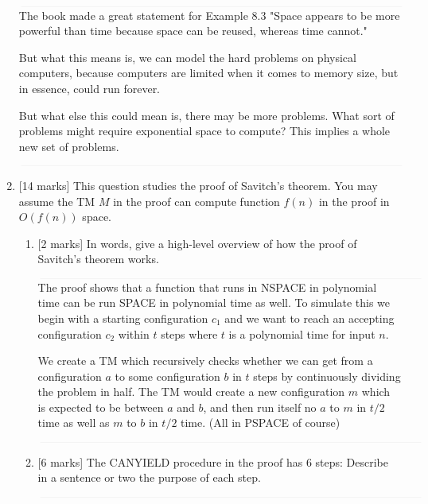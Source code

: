 \documentclass{article}
\begin{document}
\begin{enumerate}
            $\textcolor[RGB]{220,220,220}{\rule{\linewidth}{0.2pt}}$
            The book made a great statement for Example 8.3 "Space appears to be more powerful than time because space can be reused, whereas time cannot."

            But what this means is, we can model the hard problems on physical computers, because computers are limited when it comes to memory size, but in essence, could run forever.

            But what else this could mean is, there may be more problems. What sort of problems might require exponential space to compute? This implies a whole new set of problems.

            $\textcolor[RGB]{220,220,220}{\rule{\linewidth}{0.2pt}}$

            \item {[14 marks]} This question studies the proof of Savitch's theorem. You may assume the TM $M$ in the proof can compute function $f(n)$ in the proof in $O(f(n))$ space.
            \begin{enumerate}
                \item {[2 marks]} In words, give a high-level overview of how the proof of Savitch's theorem works.

            $\textcolor[RGB]{220,220,220}{\rule{\linewidth}{0.2pt}}$
            The proof shows that a function that runs in NSPACE in polynomial time can be run SPACE in polynomial time as well. To simulate this we begin with a starting configuration $c_1$ and we want to reach an accepting configuration $c_2$ within $t$ steps where $t$ is a polynomial time for input $n$.

            We create a TM which recursively checks whether we can get from a configuration $a$ to some configuration $b$ in $t$ steps by continuously dividing the problem in half. The TM would create a new configuration $m$ which is expected to be between $a$ and $b$, and then run itself no $a$ to $m$ in $t/2$ time as well as $m$ to $b$ in $t/2$ time. (All in PSPACE of course)

            $\textcolor[RGB]{220,220,220}{\rule{\linewidth}{0.2pt}}$

                \item {[6 marks]} The CANYIELD procedure in the proof has 6 steps: Describe in a sentence or two the purpose of each step.

            $\textcolor[RGB]{220,220,220}{\rule{\linewidth}{0.2pt}}$


\end{enumerate}
\end{enumerate}
\end{document}
